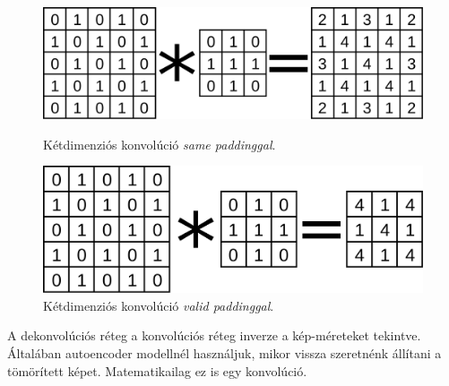 \begin{figure}[h!]
	\centering
	\begin{minipage}[c]{0.45\linewidth}
		\centering
		\includegraphics[scale=0.2]{img/konv-pelda-same-padding.pdf}
		\captionsetup{justification=centering}
		\caption{Kétdimenziós konvolúció \textit{same paddinggal}.}
		\label{fig:conv-pelda-same}
		
	\end{minipage}

	\begin{minipage}[c]{0.45\linewidth}
		\centering
		\includegraphics[scale=0.2]{img/konv-pelda.pdf}
		\captionsetup{justification=centering}
		\caption{Kétdimenziós konvolúció \textit{valid paddinggal}.}
		\label{fig:conv-pelda-valid}
		
	\end{minipage}\hfill

	
\end{figure}





A dekonvolúciós réteg a konvolúciós réteg inverze a kép-méreteket tekintve.
Általában autoencoder modellnél használjuk, mikor vissza szeretnénk állítani
a tömörített képet. Matematikailag ez is egy konvolúció.


